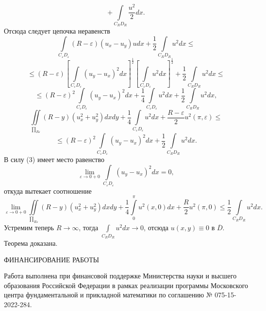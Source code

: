 \documentclass[9pt]{article}
\begin{document}
	\begin{equation*}
		+ \int\limits_{C_R D_R} \dfrac{u^2}{2}dx.
	\end{equation*}
	Отсюда следует цепочка неравенств
	\begin{equation*}
		\int\limits_{C_\varepsilon D_\varepsilon} \left(R - \varepsilon \right) \left(u_x - u_y\right)u dx + \dfrac12  \int\limits_{C_R D_R} u^2 dx \leq
	\end{equation*}
	\begin{equation*}
		\leq \left(R - \varepsilon\right) \left[\int\limits_{C_\varepsilon D_\varepsilon} \left( u_y - u_x\right)^2 dx \right]^{\frac12} \left[\int\limits_{C_\varepsilon D_\varepsilon} u^2 dx \right]^{\frac12} + \dfrac12 \int\limits_{C_RD_R} u^2 dx \leq
	\end{equation*}
	\begin{equation*}
		\leq \left(R - \varepsilon\right)^2 \int\limits_{C_\varepsilon D_\varepsilon} \left( u_y - u_x\right)^2 dx + \dfrac14 \int\limits_{C_\varepsilon D_\varepsilon} u^2 dx +\dfrac12 \int\limits_{C_RD_R} u^2 dx, 
	\end{equation*}
	\begin{equation*}
		\iint\limits_{\prod_{R\varepsilon}} \left(R - y\right) \left(u_x^2 + u_y^2\right) dx dy + \dfrac{1}{4}\int\limits_{C_\varepsilon D_\varepsilon} u^2 dx +\dfrac{R - \varepsilon}{2}u^2(\pi, \varepsilon) \leq 
	\end{equation*}
	\begin{equation*}
		\leq \left(R - \varepsilon\right)^2 \int\limits_{C_\varepsilon D_\varepsilon} \left( u_y - u_x\right)^2 dx  +\dfrac12 \int\limits_{C_RD_R} u^2 dx.
	\end{equation*}
	В силу (3) имеет место равенство
	\begin{equation*}
		\lim\limits_{\varepsilon \to 0 + 0} \int\limits_{C_\varepsilon D_\varepsilon} \left(u_y - u_x\right)^2 dx = 0,
	\end{equation*}
	откуда вытекает соотношение
	\begin{equation*}
		\lim\limits_{\varepsilon \to 0 + 0} \iint\limits_{\prod_{R\varepsilon}} \left(R - y\right) \left(u_x^2 + u_y^2 \right) dx dy + \dfrac14 \int\limits_0^\pi u^2(x,0) dx + \dfrac{R}{2}u^2(\pi,0) \leq \dfrac12 \int\limits_{C_RD_R} u^2 dx.
	\end{equation*}
	Устремим теперь $R \to \infty$, тогда $\int\limits_{C_RD_R} u^2 dx \to 0$, отсюда $u(x,y) \equiv 0$ в $\overline{D}$. Теорема доказана.
	\begin{center}{ФИНАНСИРОВАНИЕ РАБОТЫ}\end{center}
	\par
	Работа выполнена при финансовой поддержке Министерства науки и высшего образования Российской Федерации в рамках реализации программы Московского центра фундаментальной и прикладной математики по соглашению № 075-15-2022-284.
	\bigskip
	
\end{document}
